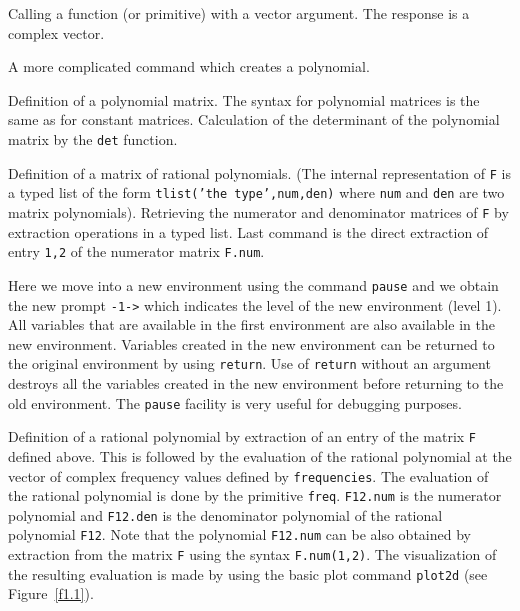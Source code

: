 \noindent\dotfill



Calling a function (or primitive) with a vector argument.  The response
is a complex vector.

\noindent\dotfill



A  more complicated command which creates a polynomial. 

\noindent\dotfill



Definition of a polynomial matrix. The syntax for polynomial matrices
is the same as for constant matrices. Calculation of the
determinant of the polynomial matrix by the {\tt det} function. 


\noindent\dotfill



Definition of a matrix of rational polynomials. (The internal representation
of {\tt F} is a typed list of the form {\tt tlist('the type',num,den)}
where {\tt num} and {\tt den} are two matrix polynomials). Retrieving
the numerator and denominator matrices of {\tt F} by extraction operations in a
typed list. Last command is the direct extraction of entry {\tt 1,2} 
of the numerator matrix {\tt F.num}.

\noindent\dotfill




Here we move into a new environment using the command 
{\tt pause}
and we obtain the new prompt {\tt -1->} which indicates the level
of the new environment (level 1).  All variables that are available
in the first environment are also available in the new environment.  Variables
created in the new environment can be returned to the original environment
by using {\tt return}.  
Use of {\tt return} without an argument 
destroys all the variables created in the new environment before returning
to the old environment. The {\tt pause} facility is very useful 
for debugging purposes.

\noindent\dotfill



Definition of a rational polynomial by extraction of an entry
of the matrix {\tt F} defined above.  This is followed by the evaluation
of the rational polynomial at the vector of complex frequency values defined
by {\tt frequencies}.  The evaluation of the rational polynomial is done by
the primitive {\tt freq}. {\tt F12.num} is the numerator
polynomial and {\tt F12.den} is the denominator polynomial of the
rational polynomial {\tt F12}. Note that
the polynomial {\tt F12.num} can be also obtained by extraction
from the matrix {\tt F} using the syntax {\tt F.num(1,2)}.
The  visualization of the resulting evaluation
is made by using the basic plot command {\tt plot2d} (see Figure~\ref{f1.1}).

